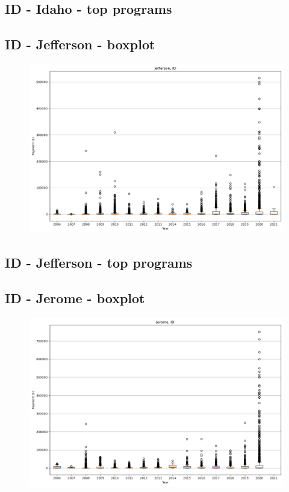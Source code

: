 \subsection*{ID - Idaho - top programs}

\newpage
\subsection*{ID - Jefferson - boxplot}
\begin{figure}[h]
\centering
\includegraphics[width=7in]{../output/boxplots/counties/Jefferson-ID_boxplot.png}
\end{figure}


\subsection*{ID - Jefferson - top programs}

\newpage
\subsection*{ID - Jerome - boxplot}
\begin{figure}[h]
\centering
\includegraphics[width=7in]{../output/boxplots/counties/Jerome-ID_boxplot.png}
\end{figure}


